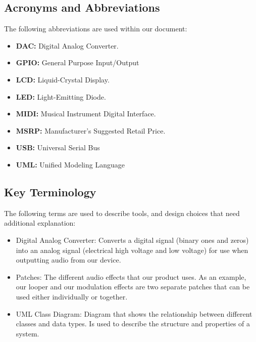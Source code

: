 
\subsection{Acronyms and Abbreviations}
    The following abbreviations are used within our document:
    \begin{itemize}
        \item \label{DAC} \textbf{DAC:} Digital Analog Converter.
        \item \label{GPIO} \textbf{GPIO:} General Purpose Input/Output
        \item \label{LCD} \textbf{LCD:} Liquid-Crystal Display.
        \item \label{LED} \textbf{LED:} Light-Emitting Diode.
        \item \label{MIDI} \textbf{MIDI:} Musical Instrument Digital Interface.
        \item \label{MSRP} \textbf{MSRP:} Manufacturer's Suggested Retail Price.
        \item \label{USB} \textbf{USB:} Universal Serial Bus
        \item \label{UML} \textbf{UML:} Unified Modeling Language
    \end{itemize}

\subsection{Key Terminology}
    The following terms are used to describe tools, and design choices that need additional explanation:
    \begin{itemize}
        \item Digital Analog Converter: Converts a digital signal (binary ones and zeros) into an analog signal (electrical high voltage and low voltage) for use when outputting audio from our device.
        \item Patches: The different audio effects that our product uses. As an example, our looper and our modulation effects are two separate patches that can be used either individually or together.
        \item UML Class Diagram: Diagram that shows the relationship between different classes and data types. Is used to describe the structure and properties of a system.
        
    \end{itemize}